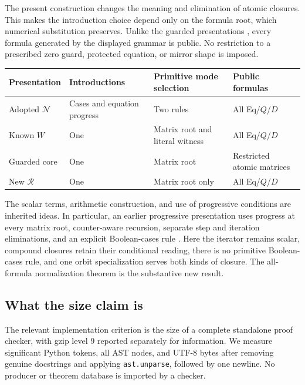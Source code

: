 \documentclass[11pt,a4paper]{article}
\theoremstyle{definition}
\begin{document}
The present construction changes the meaning and elimination of atomic
closures. This makes the introduction choice depend only on the formula
root, which numerical substitution preserves. Unlike the guarded
presentations \cite{guarded}, every formula generated by the displayed
grammar is public. No restriction to a prescribed zero guard, protected
equation, or mirror shape is imposed.

\begin{center}
\small
\begin{tabular}{@{}p{}p{}p{}p{}@{}}
\toprule
Presentation & Introductions & Primitive mode selection & Public formulas \\
\midrule
Adopted $\mathcal N$ & Cases and equation progress & Two rules & All Eq/$Q$/$D$ \\
Known $W$ & One & Matrix root and literal witness & All Eq/$Q$/$D$ \\
Guarded core & One & Matrix root & Restricted atomic matrices \\
New $\mathcal R$ & One & Matrix root only & All Eq/$Q$/$D$ \\
\bottomrule
\end{tabular}
\end{center}

The scalar terms, arithmetic construction, and use of progressive
conditions are inherited ideas. In particular, an earlier progressive
presentation uses progress at every matrix root, counter-aware recursion,
separate step and iteration eliminations, and an explicit Boolean-cases
rule \cite{progressive}. Here the iterator remains scalar, compound
closures retain their conditional reading, there is no primitive
Boolean-cases rule, and one orbit specialization serves both kinds of
closure. The all-formula normalization theorem is the substantive new
result.

\subsection{What the size claim is}

The relevant implementation criterion is the size of a complete
standalone proof checker, with gzip level 9 reported separately for
information. We measure significant Python tokens, all AST nodes, and
UTF-8 bytes after removing genuine docstrings and applying
\texttt{ast.unparse}, followed by one newline. No producer or theorem
database is imported by a checker.
\end{document}

